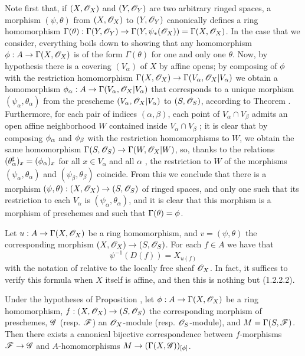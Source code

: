Note first that, if $(X,\mathscr{O}_X)$ and $(Y,\mathscr{O}_Y)$ are two arbitrary ringed spaces,
a morphism $(\psi,\theta)$ from $(X,\mathscr{O}_X)$ to $(Y,\mathscr{O}_Y)$ canonically defines a ring
homomorphism
$\Gamma(\theta):\Gamma(Y,\mathscr{O}_Y)\to\Gamma(Y,\psi_*(\mathscr{O}_X))=\Gamma(X,\mathscr{O}_X)$.
In the case that we consider, everything boils down to showing that any
homomorphism $\phi:A\to\Gamma(X,\mathscr{O}_X)$ is of the form $\Gamma(\theta)$
for one and only one $\theta$. Now, by hypothesis there is a covering
$(V_\alpha)$ of $X$ by affine opens; by composing of $\phi$ with the
restriction homomorphism $\Gamma(X,\mathscr{O}_X)\to\Gamma(V_\alpha,\mathscr{O}_X|V_\alpha)$ we
obtain a homomorphism $\phi_\alpha:A\to\Gamma(V_\alpha,\mathscr{O}_X|V_\alpha)$
that corresponds to a unique morphism $(\psi_\alpha,\theta_\alpha)$ from the
prescheme $(V_\alpha,\mathscr{O}_X|V_\alpha)$ to $(S,\mathscr{O}_S)$, according to Theorem .
Furthermore, for each pair of indices $(\alpha,\beta)$, each point of
$V_\alpha\cap V_\beta$ admits an open affine neighborhood $W$ contained inside
$V_\alpha\cap V_\beta$ ; it is clear that by composing
$\phi_\alpha$ and $\phi_\beta$ with the restriction homomorphisms to $W$,
we obtain the same homomorphism $\Gamma(S,\mathscr{O}_S)\to\Gamma(W,\mathscr{O}_X|W)$, so, thanks
to the relations $(\theta_\alpha^\sharp)_x=(\phi_\alpha)_x$ for all $x\in
V_\alpha$ and all $\alpha$ , the restriction to $W$ of the morphisms
$(\psi_\alpha,\theta_\alpha)$ and $(\psi_\beta,\theta_\beta)$ coincide. From
this we conclude that there is a morphism
$(\psi,\theta):(X,\mathscr{O}_X)\to(S,\mathscr{O}_S)$ of ringed spaces, and only one such
that its restriction to each $V_\alpha$ is $(\psi_\alpha,\theta_\alpha)$, and it
is clear that this morphism is a morphism of preschemes and such that
$\Gamma(\theta)=\phi$.

Let $u:A\to\Gamma(X,\mathscr{O}_X)$ be a ring homomorphism, and $v=(\psi,\theta)$
the corresponding morphism $(X,\mathscr{O}_X)\to(S,\mathscr{O}_S)$. For each $f\in A$ we have
that
\[
  \psi^{-1}(D(f))=X_{u(f)}
  \tag{2.2.4.1}
\]
with the notation of  relative to the locally free sheaf
$\mathscr{O}_X$. In fact, it suffices to verify this formula when $X$ itself is affine,
and then this is nothing but (1.2.2.2).

\begin{prop}[2.2.5]
\label{1.2.2.5}
Under the hypotheses of Proposition , let
$\phi:A\to\Gamma(X,\mathscr{O}_X)$ be a ring homomorphism,
$f:(X,\mathscr{O}_X)\to(S,\mathscr{O}_S)$ the corresponding morphism of preschemes,
$\mathscr{G}$ (resp. $\mathscr{F}$) an $\mathscr{O}_X$-module (resp. $\mathscr{O}_S$-module), and
$M=\Gamma(S,\mathscr{F})$. Then there exists a canonical bijective
correspondence between $f$-morphisms $\mathscr{F}\to\mathscr{G}$  and
$A$-homomorphisms $M\to(\Gamma(X,\mathscr{G}))_{[\phi]}$.
\end{prop}


